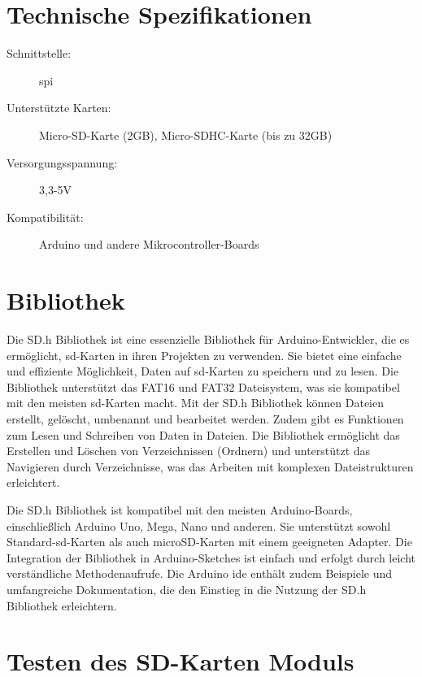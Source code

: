 \section{Technische Spezifikationen}

\begin{description}
    \item[Schnittstelle:] \ac{spi}
    \item[Unterstützte Karten:] Micro-SD-Karte (2GB), Micro-SDHC-Karte (bis zu 32GB)
    \item[Versorgungsspannung:] 3,3-5V
    \item[Kompatibilität:] Arduino und andere Mikrocontroller-Boards
\end{description}
\cite{AZ-Delivery:2021}



\section{Bibliothek }

Die SD.h Bibliothek ist eine essenzielle Bibliothek für Arduino-Entwickler, die es ermöglicht, \ac{sd}-Karten in ihren Projekten zu verwenden. Sie bietet eine einfache und effiziente Möglichkeit, Daten auf \ac{sd}-Karten zu speichern und zu lesen. Die Bibliothek unterstützt das FAT16 und FAT32 Dateisystem, was sie kompatibel mit den meisten \ac{sd}-Karten macht. Mit der SD.h Bibliothek können Dateien erstellt, gelöscht, umbenannt und bearbeitet werden. Zudem gibt es Funktionen zum Lesen und Schreiben von Daten in Dateien. Die Bibliothek ermöglicht das Erstellen und Löschen von Verzeichnissen (Ordnern) und unterstützt das Navigieren durch Verzeichnisse, was das Arbeiten mit komplexen Dateistrukturen erleichtert.

Die SD.h Bibliothek ist kompatibel mit den meisten Arduino-Boards, einschließlich Arduino Uno, Mega, Nano und anderen. Sie unterstützt sowohl Standard-\ac{sd}-Karten als auch microSD-Karten mit einem geeigneten Adapter. Die Integration der Bibliothek in Arduino-Sketches ist einfach und erfolgt durch leicht verständliche Methodenaufrufe. Die Arduino \ac{ide} enthält zudem Beispiele und umfangreiche Dokumentation, die den Einstieg in die Nutzung der SD.h Bibliothek erleichtern.


\section{Testen des SD-Karten Moduls}

